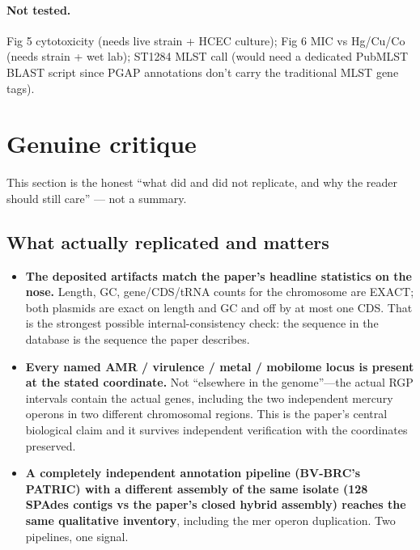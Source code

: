 \documentclass[11pt]{article}
\begin{document}
\paragraph{Not tested.} Fig 5 cytotoxicity (needs live strain + HCEC culture); Fig 6 MIC vs
Hg/Cu/Co (needs strain + wet lab); ST1284 MLST call (would need a dedicated PubMLST BLAST script
since PGAP annotations don't carry the traditional MLST gene tags).

\section{Genuine critique}
This section is the honest ``what did and did not replicate, and why the reader should still care''
--- not a summary.

\subsection{What actually replicated and matters}
\begin{itemize}
  \item \textbf{The deposited artifacts match the paper's headline statistics on the nose.} Length,
        GC, gene/CDS/tRNA counts for the chromosome are EXACT; both plasmids are exact on length
        and GC and off by at most one CDS. That is the strongest possible internal-consistency
        check: the sequence in the database is the sequence the paper describes.
  \item \textbf{Every named AMR / virulence / metal / mobilome locus is present at the stated
        coordinate.} Not ``elsewhere in the genome''---the actual RGP intervals contain the actual
        genes, including the two independent mercury operons in two different chromosomal regions.
        This is the paper's central biological claim and it survives independent verification
        with the coordinates preserved.
  \item \textbf{A completely independent annotation pipeline (BV-BRC's PATRIC) with a different
        assembly of the same isolate (128 SPAdes contigs vs the paper's closed hybrid assembly)
        reaches the same qualitative inventory}, including the mer operon duplication. Two
        pipelines, one signal.
\end{itemize}
\end{document}
